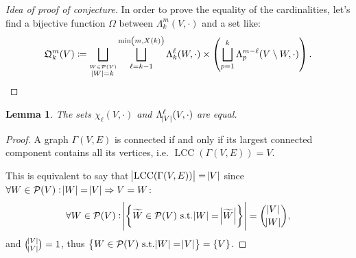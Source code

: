 \documentclass{article}
\newtheorem{lemma}{Lemma}[section]
\theoremstyle{definition}
\theoremstyle{remark}
\DeclareMathOperator{\LCC}{LCC}
\newcommand{\st}{\text{ s.t.}}
\begin{document}
	\begin{proof}[Idea of proof of conjecture] In order to prove the equality of the cardinalities, let's find a bijective function $\Omega$ between
	$\Lambda_k^m(V, \cdot)$ and a set like:
	\[\mathfrak Q_k^m(V) \coloneqq \bigsqcup_{\stackrel {W \in \mathcal P(V)}{\abs W = k}}\bigsqcup_{\ell=k-1}^{\min\left(m, X(k)\right)}
		\Lambda_k^\ell(W, \cdot) \times \left(\bigsqcup_{p=1}^k \Lambda_p^{m-\ell}(V \setminus W, \cdot)\right).\]

	\end{proof}

	\begin{lemma} The sets $\chi_\ell(V, \cdot)$ and $\Lambda_{\abs V}^\ell(V, \cdot)$ are equal.
	\end{lemma}

	\begin{proof} A graph $\Gamma(V, E)$ is connected if and only if its largest connected component contains all its vertices, i.e. $\LCC(\Gamma(V, E)) = V$.

	This is equivalent to say that $\abs {\LCC(\Gamma(V, E))} = \abs V$ since $\forall W \in \mathcal P(V) : \abs W = \abs V \Rightarrow V = W$:
	\[\forall W \in \mathcal P(V) : \abs {\left\{\widetilde W \in \mathcal P(V) \st \abs W = \abs {\widetilde W}\right\}} = \binom {\abs V}{\abs W},\]
	and $\binom {\abs V}{\abs V} = 1$, thus $\left\{W \in \mathcal P(V) \st \abs W = \abs V\right\} = \{V\}$.
	\end{proof}
\end{document}
